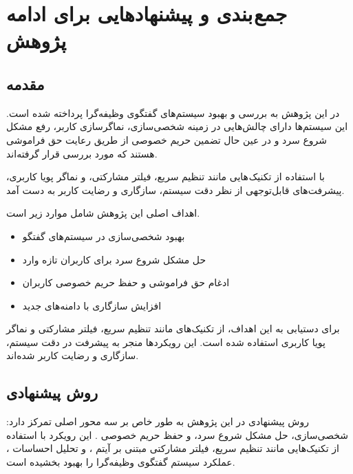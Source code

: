 \chapter{جمع بندی و پیشنهادهایی برای ادامه پژوهش}
\section{مقدمه}

در این پژوهش به بررسی و بهبود سیستم‌های گفتگوی وظیفه‌گرا پرداخته شده است. این سیستم‌ها دارای چالش‌هایی در زمینه شخصی‌سازی، نماگر‌سازی کاربر، رفع مشکل شروع سرد و در عین حال تضمین حریم خصوصی از طریق رعایت حق فراموشی هستند که مورد بررسی قرار گرفته‌اند.

با استفاده از تکنیک هایی مانند تنظیم سریع، فیلتر مشارکتی، و نماگر پویا کاربری، پیشرفت‌های قابل‌توجهی از نظر دقت سیستم، سازگاری و رضایت کاربر به دست آمد.

اهداف اصلی این پژوهش شامل موارد زیر است.

\begin{itemize}
\item
بهبود شخصی‌سازی در سیستم‌های گفتگو
\item 
حل مشکل شروع سرد برای کاربران تازه وارد
\item    
ادغام حق فراموشی و حفظ حریم خصوصی کاربران
\item    
افزایش سازگاری با دامنه‌های جدید
\end{itemize}
برای دستیابی به این اهداف، از تکنیک‌های مانند تنظیم سریع، فیلتر مشارکتی و نماگر پویا کاربری استفاده شده است. این رویکردها منجر به پیشرفت‌ در دقت سیستم، سازگاری و رضایت کاربر شده‌اند.

\section{روش پیشنهادی}
روش پیشنهادی در این پژوهش به طور خاص بر سه محور اصلی تمرکز دارد: شخصی‌سازی، حل مشکل شروع سرد، و حفظ حریم خصوصی . این رویکرد با استفاده از تکنیک‌هایی مانند تنظیم سریع، فیلتر مشارکتی مبتنی بر آیتم ، و تحلیل احساسات ، عملکرد سیستم گفتگوی وظیفه‌گرا را بهبود بخشیده است.

